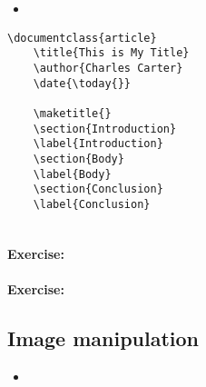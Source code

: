         \begin{framed}
            \begin{itemize}
                \item{}
            \end{itemize}
        \end{framed}


        \begin{verbatim}
\documentclass{article}
    \title{This is My Title}
    \author{Charles Carter}
    \date{\today{}}
 
    \maketitle{}
    \section{Introduction}
    \label{Introduction}
    \section{Body}
    \label{Body}
    \section{Conclusion}
    \label{Conclusion}
    
        \end{verbatim}

        \paragraph{Exercise:}

        \paragraph{Exercise:}

        \subsection{Image manipulation}
        \label{}
        
        \begin{framed}
            \begin{itemize}
                \item{}
            \end{itemize}
        \end{framed}


